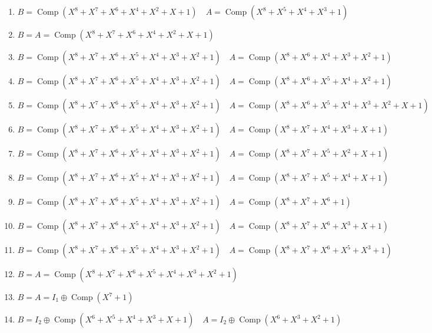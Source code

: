 \documentclass[10pt]{article}
\begin{document}
\begin{enumerate}
  \item $B=\operatorname{Comp}\left(X^{8}+X^{7}+X^{6}+X^{4}+X^{2}+X+1\right) \quad A=\operatorname{Comp}\left(X^{8}+X^{5}+X^{4}+X^{3}+1\right)$
  \item $B=A=\operatorname{Comp}\left(X^{8}+X^{7}+X^{6}+X^{4}+X^{2}+X+1\right)$
  \item $B=\operatorname{Comp}\left(X^{8}+X^{7}+X^{6}+X^{5}+X^{4}+X^{3}+X^{2}+1\right) \quad A=\operatorname{Comp}\left(X^{8}+X^{6}+\right. \left.X^{4}+X^{3}+X^{2}+1\right)$
  \item $B=\operatorname{Comp}\left(X^{8}+X^{7}+X^{6}+X^{5}+X^{4}+X^{3}+X^{2}+1\right) \quad A=\operatorname{Comp}\left(X^{8}+X^{6}+\right. \left.X^{5}+X^{4}+X^{2}+1\right)$
  \item $B=\operatorname{Comp}\left(X^{8}+X^{7}+X^{6}+X^{5}+X^{4}+X^{3}+X^{2}+1\right) \quad A=\operatorname{Comp}\left(X^{8}+X^{6}+\right. \left.X^{5}+X^{4}+X^{3}+X^{2}+X+1\right)$
  \item $B=\operatorname{Comp}\left(X^{8}+X^{7}+X^{6}+X^{5}+X^{4}+X^{3}+X^{2}+1\right) \quad A=\operatorname{Comp}\left(X^{8}+X^{7}+\right. \left.X^{4}+X^{3}+X+1\right)$
  \item $B=\operatorname{Comp}\left(X^{8}+X^{7}+X^{6}+X^{5}+X^{4}+X^{3}+X^{2}+1\right) \quad A=\operatorname{Comp}\left(X^{8}+X^{7}+\right. \left.X^{5}+X^{2}+X+1\right)$
  \item $B=\operatorname{Comp}\left(X^{8}+X^{7}+X^{6}+X^{5}+X^{4}+X^{3}+X^{2}+1\right) \quad A=\operatorname{Comp}\left(X^{8}+X^{7}+\right. \left.X^{5}+X^{4}+X+1\right)$
  \item $B=\operatorname{Comp}\left(X^{8}+X^{7}+X^{6}+X^{5}+X^{4}+X^{3}+X^{2}+1\right) \quad A=\operatorname{Comp}\left(X^{8}+X^{7}+X^{6}+1\right)$
  \item $B=\operatorname{Comp}\left(X^{8}+X^{7}+X^{6}+X^{5}+X^{4}+X^{3}+X^{2}+1\right) \quad A=\operatorname{Comp}\left(X^{8}+X^{7}+\right. \left.X^{6}+X^{3}+X+1\right)$
  \item $B=\operatorname{Comp}\left(X^{8}+X^{7}+X^{6}+X^{5}+X^{4}+X^{3}+X^{2}+1\right) \quad A=\operatorname{Comp}\left(X^{8}+X^{7}+\right. \left.X^{6}+X^{5}+X^{3}+1\right)$
  \item $B=A=\operatorname{Comp}\left(X^{8}+X^{7}+X^{6}+X^{5}+X^{4}+X^{3}+X^{2}+1\right)$
  \item $B=A=I_{1} \oplus \operatorname{Comp}\left(X^{7}+1\right)$
  \item $B=I_{2} \oplus \operatorname{Comp}\left(X^{6}+X^{5}+X^{4}+X^{3}+X+1\right) \quad A=I_{2} \oplus \operatorname{Comp}\left(X^{6}+X^{3}+X^{2}+1\right)$

\end{enumerate}
\end{document}
